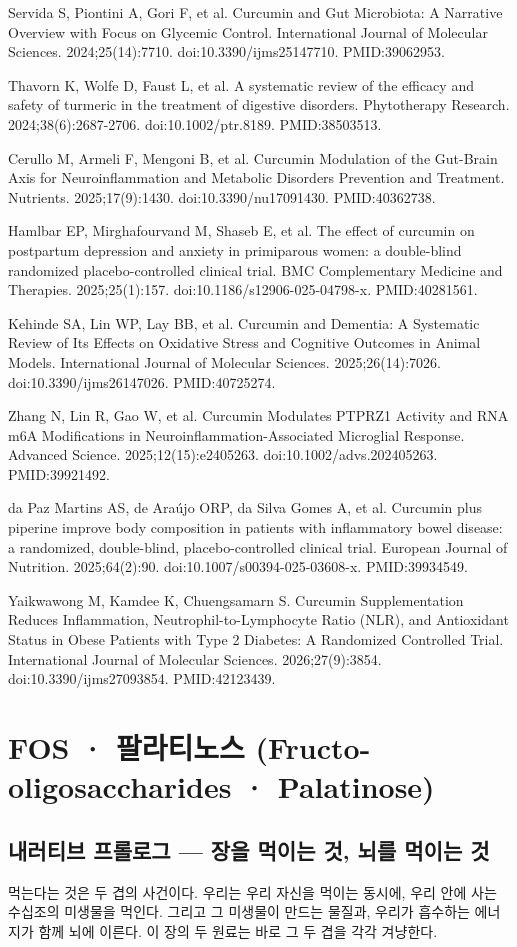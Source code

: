 \documentclass[11pt,oneside]{book}
\newcommand{\refend}{\endgroup\par}
\newcommand{\reff}[2]{\par\hangindent=7mm\hangafter=1\noindent[#1]\hspace{2mm}#2\par}
\begin{document}
\reff{32}{Servida S, Piontini A, Gori F, et al. Curcumin and Gut Microbiota: A Narrative Overview with Focus on Glycemic Control. International Journal of Molecular Sciences. 2024;25(14):7710. doi:10.3390/ijms25147710. PMID:39062953.}
\reff{33}{Thavorn K, Wolfe D, Faust L, et al. A systematic review of the efficacy and safety of turmeric in the treatment of digestive disorders. Phytotherapy Research. 2024;38(6):2687-2706. doi:10.1002/ptr.8189. PMID:38503513.}
\reff{34}{Cerullo M, Armeli F, Mengoni B, et al. Curcumin Modulation of the Gut-Brain Axis for Neuroinflammation and Metabolic Disorders Prevention and Treatment. Nutrients. 2025;17(9):1430. doi:10.3390/nu17091430. PMID:40362738.}
\reff{35}{Hamlbar EP, Mirghafourvand M, Shaseb E, et al. The effect of curcumin on postpartum depression and anxiety in primiparous women: a double-blind randomized placebo-controlled clinical trial. BMC Complementary Medicine and Therapies. 2025;25(1):157. doi:10.1186/s12906-025-04798-x. PMID:40281561.}
\reff{36}{Kehinde SA, Lin WP, Lay BB, et al. Curcumin and Dementia: A Systematic Review of Its Effects on Oxidative Stress and Cognitive Outcomes in Animal Models. International Journal of Molecular Sciences. 2025;26(14):7026. doi:10.3390/ijms26147026. PMID:40725274.}
\reff{37}{Zhang N, Lin R, Gao W, et al. Curcumin Modulates PTPRZ1 Activity and RNA m6A Modifications in Neuroinflammation-Associated Microglial Response. Advanced Science. 2025;12(15):e2405263. doi:10.1002/advs.202405263. PMID:39921492.}
\reff{38}{da Paz Martins AS, de Araújo ORP, da Silva Gomes A, et al. Curcumin plus piperine improve body composition in patients with inflammatory bowel disease: a randomized, double-blind, placebo-controlled clinical trial. European Journal of Nutrition. 2025;64(2):90. doi:10.1007/s00394-025-03608-x. PMID:39934549.}
\reff{39}{Yaikwawong M, Kamdee K, Chuengsamarn S. Curcumin Supplementation Reduces Inflammation, Neutrophil-to-Lymphocyte Ratio (NLR), and Antioxidant Status in Obese Patients with Type 2 Diabetes: A Randomized Controlled Trial. International Journal of Molecular Sciences. 2026;27(9):3854. doi:10.3390/ijms27093854. PMID:42123439.}
\refend


\chapter{FOS · 팔라티노스 (Fructo-oligosaccharides · Palatinose)}

\section{내러티브 프롤로그 — 장을 먹이는 것, 뇌를 먹이는 것}
먹는다는 것은 두 겹의 사건이다. 우리는 우리 자신을 먹이는 동시에, 우리 안에 사는 수십조의 미생물을 먹인다. 그리고 그 미생물이 만드는 물질과, 우리가 흡수하는 에너지가 함께 뇌에 이른다. 이 장의 두 원료는 바로 그 두 겹을 각각 겨냥한다.
\end{document}
